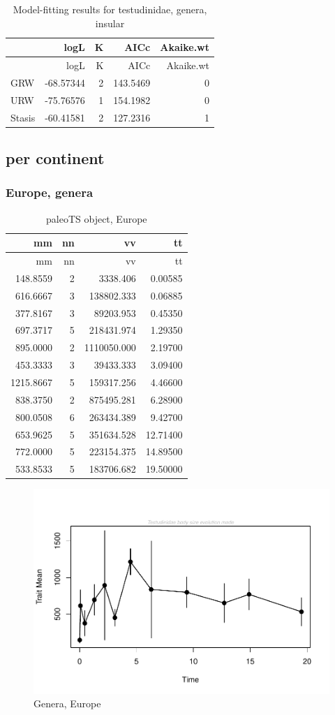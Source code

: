 \begin{longtable}[]{@{}lrrrr@{}}
	\caption{Model-fitting results for testudinidae, genera,
		insular}
	\label{tab:pTSIEM}\tabularnewline
	\toprule
	& logL & K & AICc & Akaike.wt\tabularnewline
	\midrule
	\endfirsthead
	\toprule
	& logL & K & AICc & Akaike.wt\tabularnewline
	\midrule
	\endhead
	GRW & -68.57344 & 2 & 143.5469 & 0\tabularnewline
	URW & -75.76576 & 1 & 154.1982 & 0\tabularnewline
	Stasis & -60.41581 & 2 & 127.2316 & 1\tabularnewline
	\bottomrule
\end{longtable}


\FloatBarrier
\subsection{per continent}\label{per-continent}

\subsubsection{Europe, genera}\label{europe-genera}

\begin{longtable}[]{@{}rrrr@{}}
	\caption{paleoTS object, Europe}
	\label{tab:pTSEu}\tabularnewline
	\toprule
	mm & nn & vv & tt\tabularnewline
	\midrule
	\endfirsthead
	\toprule
	mm & nn & vv & tt\tabularnewline
	\midrule
	\endhead
	148.8559 & 2 & 3338.406 & 0.00585\tabularnewline
	616.6667 & 3 & 138802.333 & 0.06885\tabularnewline
	377.8167 & 3 & 89203.953 & 0.45350\tabularnewline
	697.3717 & 5 & 218431.974 & 1.29350\tabularnewline
	895.0000 & 2 & 1110050.000 & 2.19700\tabularnewline
	453.3333 & 3 & 39433.333 & 3.09400\tabularnewline
	1215.8667 & 5 & 159317.256 & 4.46600\tabularnewline
	838.3750 & 2 & 875495.281 & 6.28900\tabularnewline
	800.0508 & 6 & 263434.389 & 9.42700\tabularnewline
	653.9625 & 5 & 351634.528 & 12.71400\tabularnewline
	772.0000 & 5 & 223154.375 & 14.89500\tabularnewline
	533.8533 & 5 & 183706.682 & 19.50000\tabularnewline
	\bottomrule
\end{longtable}

\begin{figure}[htbp]
	\centering
	\includegraphics{MA_JJ_files/figure-latex/paleoTSEurope-1.pdf}
	\caption{Genera, Europe}
	\label{fig:pTSEu}
\end{figure}

